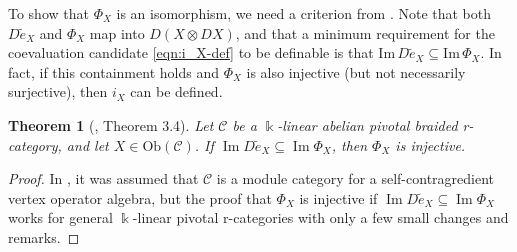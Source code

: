 \documentclass[11pt, reqno]{amsart}
\newtheorem{thm}{Theorem}[section]
\theoremstyle{definition}\newtheorem{defi}[thm]{Definition}
\theoremstyle{definition}\newtheorem{rem}[thm]{Remark}
\theoremstyle{definition}\newtheorem{exam}[thm]{Example}
\theoremstyle{definition}\newtheorem{assum}[thm]{Assumption}
\newcommand{\cC}{\mathcal{C}}
\newcommand{\til}{\widetilde}
\DeclareMathOperator{\im}{Im}
\begin{document}
To show that $\Phi_X$ is an isomorphism, we need a criterion from \cite[Section 3]{McR}. Note that both $D\til{e}_X$ and $\Phi_X$ map into $D(X\otimes DX)$, and that a minimum requirement for the coevaluation candidate \eqref{eqn:i_X-def} to be definable is that $\mathrm{Im}\,D\til{e}_X\subseteq\mathrm{Im}\,\Phi_X$. In fact, if this containment holds and $\Phi_X$ is also injective (but not necessarily surjective), then $i_X$ can be defined.
\begin{thm}[\cite{McR}, Theorem 3.4]\label{thm:injective-criterion}
Let $\cC$ be a $\Bbbk$-linear abelian pivotal braided r-category, and let $X\in\mathrm{Ob}(\cC)$. If $\im D\til{e}_X\subseteq\im\Phi_X$, then $\Phi_X$ is injective. 
\end{thm}
\begin{proof}
In \cite[Theorem 3.4]{McR}, it was assumed that $\cC$ is a module category for a self-contragredient vertex operator algebra, but the proof that $\Phi_X$ is injective if $\im D\til{e}_X\subseteq\im\Phi_X$ works for general $\Bbbk$-linear pivotal r-categories with only a few small changes and remarks.


\end{proof}
\end{document}
